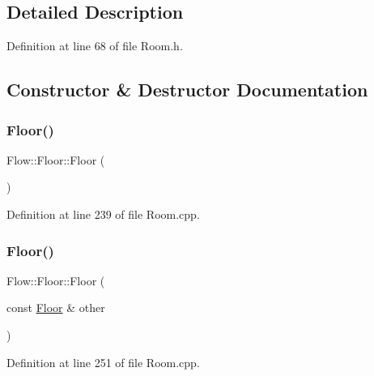 \subsection{Detailed Description}


Definition at line 68 of file Room.\+h.



\subsection{Constructor \& Destructor Documentation}
\hypertarget{class_flow_1_1_floor_a056779b11b4084e15cc7c376f791a8f3}{}\label{class_flow_1_1_floor_a056779b11b4084e15cc7c376f791a8f3} 
\subsubsection{\texorpdfstring{Floor()}{Floor()}\hspace{0.1cm}{\footnotesize\ttfamily [1/3]}}
{\footnotesize\ttfamily Flow\+::\+Floor\+::\+Floor (\begin{DoxyParamCaption}{ }\end{DoxyParamCaption})}



Definition at line 239 of file Room.\+cpp.

\hypertarget{class_flow_1_1_floor_ab4003203c3ad5de4c13d669bddbb0df5}{}\label{class_flow_1_1_floor_ab4003203c3ad5de4c13d669bddbb0df5} 
\subsubsection{\texorpdfstring{Floor()}{Floor()}\hspace{0.1cm}{\footnotesize\ttfamily [2/3]}}
{\footnotesize\ttfamily Flow\+::\+Floor\+::\+Floor (\begin{DoxyParamCaption}\item[{const \hyperlink{class_flow_1_1_floor}{Floor} \&}]{other }\end{DoxyParamCaption})}



Definition at line 251 of file Room.\+cpp.

\hypertarget{class_flow_1_1_floor_afc7d87d65bc697a8901ad9506bafb5b9}{}\label{class_flow_1_1_floor_afc7d87d65bc697a8901ad9506bafb5b9} 
